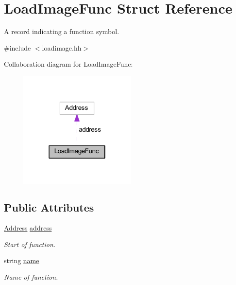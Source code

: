 \hypertarget{struct_load_image_func}{}\section{Load\+Image\+Func Struct Reference}
\label{struct_load_image_func}


A record indicating a function symbol.  




{\ttfamily \#include $<$loadimage.\+hh$>$}



Collaboration diagram for Load\+Image\+Func\+:
\nopagebreak
\begin{figure}[H]
\begin{center}
\leavevmode
\includegraphics[width=166pt]{struct_load_image_func__coll__graph}
\end{center}
\end{figure}
\subsection*{Public Attributes}
\begin{DoxyCompactItemize}
\item 
\mbox{\hyperlink{class_address}{Address}} \mbox{\hyperlink{struct_load_image_func_a928751ffba76427337bb1e7e8e808cb3}{address}}
\begin{DoxyCompactList}\small\item\em Start of function. \end{DoxyCompactList}\item 
string \mbox{\hyperlink{struct_load_image_func_a1f3c54ce75f8f381ea597fa5f127a26c}{name}}
\begin{DoxyCompactList}\small\item\em Name of function. \end{DoxyCompactList}\end{DoxyCompactItemize}



